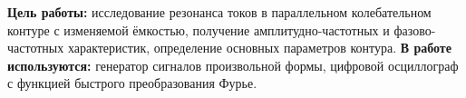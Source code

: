 \documentclass[a4paper,11pt]{extarticle}
\begin{document}


\textbf{Цель работы: }
исследование резонанса токов в параллельном колебательном контуре с изменяемой ёмкостью, получение амплитудно-частотных и фазово-частотных характеристик, определение основных параметров контура.
	\n\n
	\textbf{В работе используются: }
	генератор сигналов произвольной формы, цифровой осциллограф с функцией быстрого преобразования Фурье.

%
\end{document}
